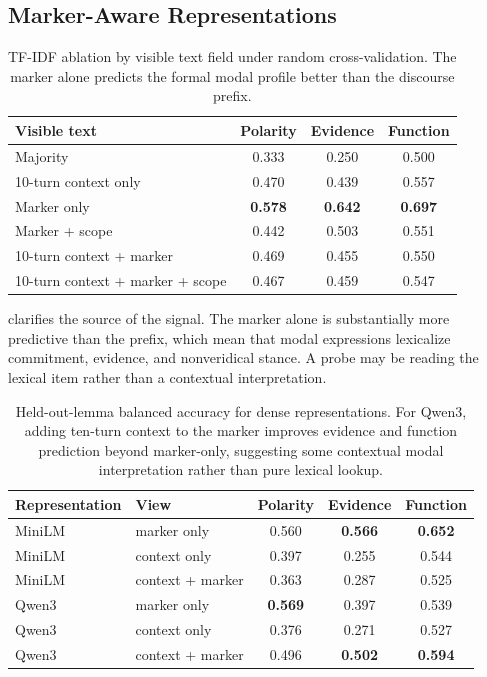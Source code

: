 \documentclass{article}
\begin{document}
\subsection{Marker-Aware Representations}

\begin{table}[t]
\centering
\small
\begin{tabular}{lccc}
\toprule
Visible text & Polarity & Evidence & Function \\
\midrule
Majority & 0.333 & 0.250 & 0.500 \\
10-turn context only & 0.470 & 0.439 & 0.557 \\
Marker only & \textbf{0.578} & \textbf{0.642} & \textbf{0.697} \\
Marker + scope & 0.442 & 0.503 & 0.551 \\
10-turn context + marker & 0.469 & 0.455 & 0.550 \\
10-turn context + marker + scope & 0.467 & 0.459 & 0.547 \\
\bottomrule
\end{tabular}
\caption{TF-IDF ablation by visible text field under random cross-validation. The marker alone predicts the formal modal profile better than the discourse prefix.}
\label{tab:ablation}
\end{table}

 clarifies the source of the signal. The marker alone is substantially more predictive than the prefix, which mean that modal expressions lexicalize commitment, evidence, and nonveridical stance. A probe may be reading the lexical item rather than a contextual interpretation.

\begin{table}[t]
\centering
\small
\begin{tabular}{llccc}
\toprule
Representation & View & Polarity & Evidence & Function \\
\midrule
MiniLM & marker only & 0.560 & \textbf{0.566} & \textbf{0.652} \\
MiniLM & context only & 0.397 & 0.255 & 0.544 \\
MiniLM & context + marker & 0.363 & 0.287 & 0.525 \\
\midrule
Qwen3 & marker only & \textbf{0.569} & 0.397 & 0.539 \\
Qwen3 & context only & 0.376 & 0.271 & 0.527 \\
Qwen3 & context + marker & 0.496 & \textbf{0.502} & \textbf{0.594} \\
\bottomrule
\end{tabular}
\caption{Held-out-lemma balanced accuracy for dense representations. For Qwen3, adding ten-turn context to the marker improves evidence and function prediction beyond marker-only, suggesting some contextual modal interpretation rather than pure lexical lookup.}
\label{tab:heldout}
\end{table}
\end{document}
